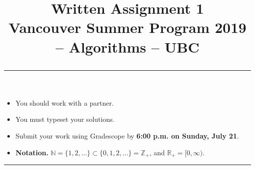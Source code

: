 \documentclass[11pt]{article}
\title{
  Written Assignment 1 \\
  \large
  Vancouver Summer Program 2019 -- Algorithms -- UBC \\
  \vspace*{0.2in} \hrule
}
\date{}
\newcommand{\R}{\mathbb{R}}
\newcommand{\Z}{\mathbb{Z}}
\newcommand{\N}{\mathbb{N}}
\begin{document}
\maketitle

\setlength{\baselineskip}{0.90\baselineskip}




\pagestyle{empty}

\vspace*{-0.75in}

\begin{itemize}
\item You should work with a partner.
\item You must typeset your solutions.
\item Submit your work using Gradescope by {\bf 6:00 p.m. on Sunday, July 21}.
\item \textbf{Notation.} $\N = \{1,2,\dotsc\} \subset \{0,1,2,\dotsc\} = \Z_{+}$, and $\R_{+} = [0,\infty)$.
\end{itemize}

\hrule
\end{document}
